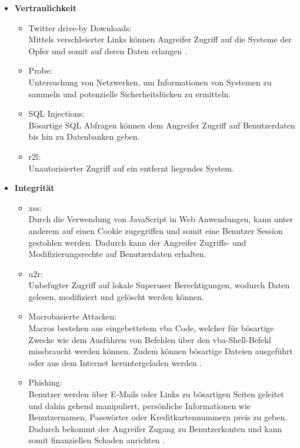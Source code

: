 \documentclass[
    12pt, %
    DIV10,
    ngerman, %
    a4paper, %
    oneside, %
    titlepage, %
    parskip=half, %
    headings=normal, %
    listof=totoc, %
    bibliography=totoc, %
    index=totoc, %
    captions=tableheading, %
    final %
]{scrreprt}
\begin{document}
\begin{itemize}
\item \textbf{Vertraulichkeit}
\begin{itemize}
\item Twitter drive-by Downloads:\\Mittels verschleierter Links können Angreifer Zugriff auf die Systeme der Opfer und somit auf deren Daten erlangen \parencite{Javed2019}.
\item Probe:\\Untersuchung von Netzwerken, um Informationen von Systemen zu sammeln und potenzielle Sicherheitslücken zu ermitteln.
\item SQL Injections:\\Bösartige SQL Abfragen können dem Angreifer Zugriff auf Benutzerdaten bis hin zu Datenbanken geben.
\item \ac{r2l}:\\Unautorisierter Zugriff auf ein entfernt liegendes System.
\end{itemize}
\item \textbf{Integrität}
\begin{itemize}
\item \ac{xss}:\\Durch die Verwendung von JavaScript in Web Anwendungen, kann unter anderem auf einen Cookie zugegriffen und somit eine Benutzer Session gestohlen werden. Dadurch kann der Angreifer Zugriffs- und Modifizierungsrechte auf Benutzerdaten erhalten. 
\item \ac{u2r}:\\Unbefugter Zugriff auf lokale Superuser Berechtigungen, wodurch Daten gelesen, modifiziert und gelöscht werden können.
\item Macrobasierte Attacken:\\Macros bestehen aus eingebettetem \ac{vba} Code, welcher für bösartige Zwecke wie dem Ausführen von Befehlen über den \ac{vba}-Shell-Befehl missbraucht werden können. Zudem können bösartige Dateien ausgeführt oder aus dem Internet heruntergeladen werden \parencite{Cohen2016}.
\item Phishing:\\Benutzer werden über E-Mails oder Links zu bösartigen Seiten geleitet und dahin gehend manipuliert, persönliche Informationen wie Benutzernamen, Passwörter oder Kreditkartennummern preis zu geben. Dadurch bekommt der Angreifer Zugang zu Benutzerkonten und kann somit finanziellen Schaden anrichten \parencite{Alswailem2019}.
\end{itemize}

\end{itemize}
\end{document}
